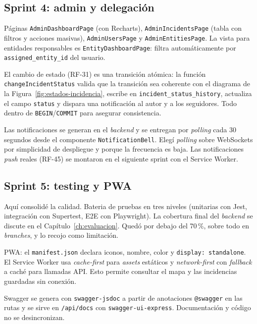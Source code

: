 \subsection{Sprint 4: admin y delegación}

Páginas \texttt{AdminDashboardPage} (con Recharts), \texttt{AdminIncidentsPage} (tabla con filtros y acciones masivas), \texttt{AdminUsersPage} y \texttt{AdminEntitiesPage}. La vista para entidades responsables es \texttt{EntityDashboardPage}: filtra automáticamente por \texttt{assigned\_entity\_id} del usuario.

El cambio de estado (RF-31) es una transición atómica: la función \texttt{changeIncidentStatus} valida que la transición sea coherente con el diagrama de la Figura~\ref{fig:estados-incidencia}, escribe en \texttt{incident\_status\_history}, actualiza el campo \texttt{status} y dispara una notificación al autor y a los seguidores. Todo dentro de \texttt{BEGIN}/\texttt{COMMIT} para asegurar consistencia.

Las notificaciones se generan en el \textit{backend} y se entregan por \textit{polling} cada 30 segundos desde el componente \texttt{NotificationBell}. Elegí \textit{polling} sobre WebSockets por simplicidad de despliegue y porque la frecuencia es baja. Las notificaciones \textit{push} reales (RF-45) se montaron en el siguiente sprint con el Service Worker.


\subsection{Sprint 5: testing y PWA}

Aquí consolidé la calidad. Bateria de pruebas en tres niveles (unitarias con Jest, integración con Supertest, E2E con Playwright). La cobertura final del \textit{backend} se discute en el Capítulo~\ref{ch:evaluacion}. Quedó por debajo del 70\,\%, sobre todo en \textit{branches}, y lo recojo como limitación.

PWA: el \texttt{manifest.json} declara iconos, nombre, color y \texttt{display: standalone}. El Service Worker usa \textit{cache-first} para \textit{assets} estáticos y \textit{network-first} con \textit{fallback} a caché para llamadas API. Esto permite consultar el mapa y las incidencias guardadas sin conexión.

Swagger se genera con \texttt{swagger-jsdoc} a partir de anotaciones \texttt{@swagger} en las rutas y se sirve en \texttt{/api/docs} con \texttt{swagger-ui-express}. Documentación y código no se desincronizan.


